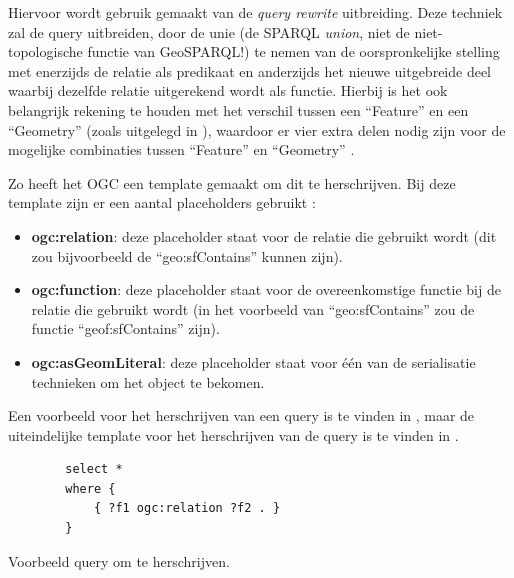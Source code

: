 Hiervoor wordt gebruik gemaakt van de \textit{query rewrite} uitbreiding. Deze techniek zal de query uitbreiden, door de unie (de SPARQL \textit{union}, niet de niet-topologische functie van GeoSPARQL!) te nemen van de oorspronkelijke stelling met enerzijds de relatie als predikaat en anderzijds het nieuwe uitgebreide deel waarbij dezelfde relatie uitgerekend wordt als functie. Hierbij is het ook belangrijk rekening te houden met het verschil tussen een ``Feature'' en een ``Geometry'' (zoals uitgelegd in ), waardoor er vier extra delen nodig zijn voor de mogelijke combinaties tussen ``Feature'' en ``Geometry'' \cite{ogcdocs}. 

Zo heeft het OGC een template gemaakt om dit te herschrijven. Bij deze template zijn er een aantal placeholders gebruikt \cite{ogcdocs}:
\begin{itemize}
    \item \textbf{ogc:relation}: deze placeholder staat voor de relatie die gebruikt wordt (dit zou bijvoorbeeld de ``geo:sfContains'' kunnen zijn).
    \item \textbf{ogc:function}: deze placeholder staat voor de overeenkomstige functie bij de relatie die gebruikt wordt (in het voorbeeld van ``geo:sfContains'' zou de functie ``geof:sfContains'' zijn).
    \item \textbf{ogc:asGeomLiteral}: deze placeholder staat voor één van de serialisatie technieken om het object te bekomen.
\end{itemize}

Een voorbeeld voor het herschrijven van een query is te vinden in , maar de uiteindelijke template voor het herschrijven van de query is te vinden in .

\begin{listing}[ht]
    \begin{verbatim}
        select *
        where {
            { ?f1 ogc:relation ?f2 . }
        }
    \end{verbatim}
    \caption{Voorbeeld query om te herschrijven.}
    \label{listing:geosparql_query_to_rewrite}
\end{listing}

